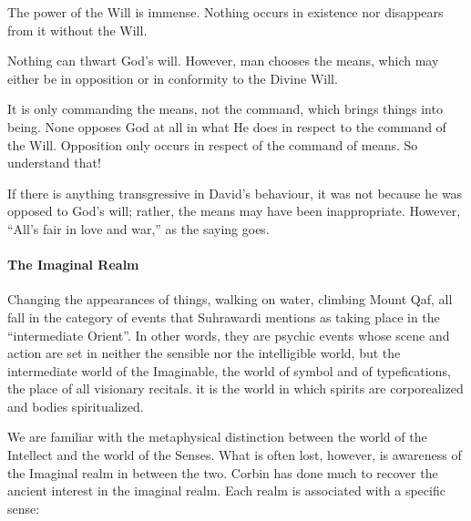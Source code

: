 \begin{quotex}
The power of the Will is immense. Nothing occurs in existence nor disappears from it without the Will. 

\end{quotex}
Nothing can thwart God's will. However, man chooses the means, which may either be in opposition or in conformity to the Divine Will.

\begin{quotex}
It is only commanding the means, not the command, which brings things into being. None opposes God at all in what He does in respect to the command of the Will. Opposition only occurs in respect of the command of means. So understand that!

\end{quotex}
If there is anything transgressive in David's behaviour, it was not because he was opposed to God's will; rather, the means may have been inappropriate. However, “All's fair in love and war,” as the saying goes.

\paragraph{The Imaginal Realm}
\begin{quotex}
Changing the appearances of things, walking on water, climbing Mount Qaf, all fall in the category of events that Suhrawardi mentions as taking place in the “intermediate Orient”. In other words, they are psychic events whose scene and action are set in neither the sensible nor the intelligible world, but the intermediate world of the Imaginable, the world of symbol and of typefications, the place of all visionary recitals. it is the world in which spirits are corporealized and bodies spiritualized. 

\end{quotex}
We are familiar with the metaphysical distinction between the world of the Intellect and the world of the Senses. What is often lost, however, is awareness of the Imaginal realm in between the two. Corbin has done much to recover the ancient interest in the imaginal realm. Each realm is associated with a specific sense:

